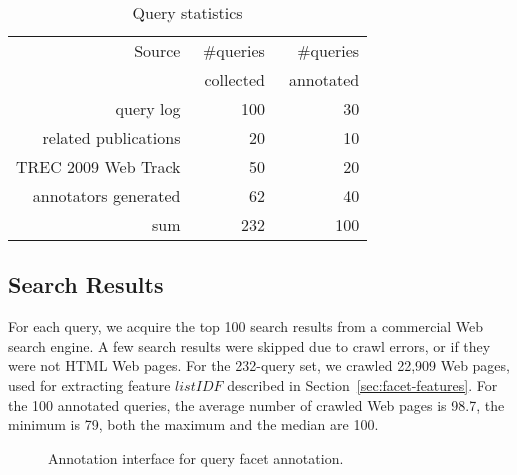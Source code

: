 \begin{table}[ht!]
\vspace{-3mm}
\centering
\caption{Query statistics}
\label{tab:queries}
\begin{tabular}{|r|r|r|} \hline
Source& \#queries& \#queries \\ 
& \ collected& \  annotated\\ \hline
query log & 100 & 30\\ 
related publications & 20 & 10\\ 
TREC 2009 Web Track & 50 & 20\\ 
annotators generated & 62 & 40\\ \hline
sum & 232 & 100\\ \hline
\end{tabular}
\end{table}	

\subsection{Search Results}
For each query, we acquire the top 100 search results from a commercial Web search engine.
A few search results were skipped due to crawl errors, or if they were not HTML Web pages.
For the 232-query set, we crawled 22,909 Web pages, used for extracting feature $listIDF$ described in Section~\ref{sec:facet-features}. For the 100 annotated queries, the average number of crawled Web pages is 98.7, the minimum is 79, both the maximum and the median are 100.

\begin{figure}[ht!]
\centering
{}
\caption{Annotation interface for query facet annotation.}
\label{fig:facet-annotation}
\end{figure}

